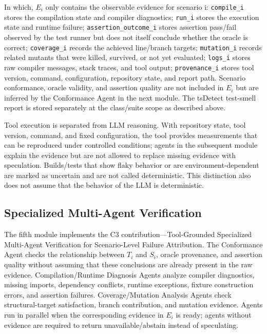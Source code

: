 \documentclass[pdflatex,sn-basic,Numbered,iicol]{sn-jnl}
\begin{document}
In which, $E_i$ only contains the observable evidence for scenario i: \texttt{compile\_i} stores the compilation state and compiler diagnostics; \texttt{run\_i} stores the execution state and runtime failure; \texttt{assertion\_outcome\_i} stores assertion pass/fail observed by the test runner but does not itself conclude whether the oracle is correct; \texttt{coverage\_i} records the achieved line/branch targets; \texttt{mutation\_i} records related mutants that were killed, survived, or not yet evaluated; \texttt{logs\_i} stores raw compiler messages, stack traces, and tool output; \texttt{provenance\_i} stores tool version, command, configuration, repository state, and report path. Scenario conformance, oracle validity, and assertion quality are not included in $E_i$ but are inferred by the Conformance Agent in the next module. The tsDetect test-smell report is stored separately at the class/suite scope as described above.

Tool execution is separated from LLM reasoning. With repository state, tool version, command, and fixed configuration, the tool provides measurements that can be reproduced under controlled conditions; agents in the subsequent module explain the evidence but are not allowed to replace missing evidence with speculation. Builds/tests that show flaky behavior or are environment-dependent are marked as uncertain and are not called deterministic. This distinction also does not assume that the behavior of the LLM is deterministic.

\subsection{Specialized Multi-Agent Verification}\label{subsec:specialized-verification}

The fifth module implements the C3 contribution---Tool-Grounded Specialized Multi-Agent Verification for Scenario-Level Failure Attribution. The Conformance Agent checks the relationship between $T_i$ and $S_i$, oracle provenance, and assertion quality without assuming that these conclusions are already present in the raw evidence. Compilation/Runtime Diagnosis Agents analyze compiler diagnostics, missing imports, dependency conflicts, runtime exceptions, fixture construction errors, and assertion failures. Coverage/Mutation Analysis Agents check structural-target satisfaction, branch contribution, and mutation evidence. Agents run in parallel when the corresponding evidence in $E_i$ is ready; agents without evidence are required to return unavailable/abstain instead of speculating.
\end{document}
